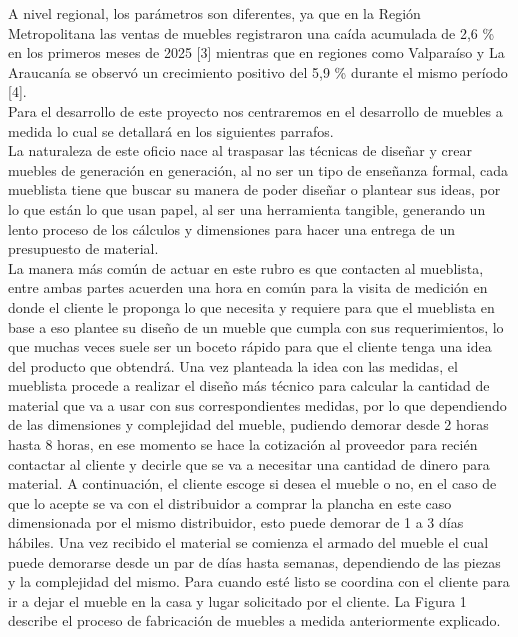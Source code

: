 \documentclass[12pt,oneside]{article}
\begin{document}
\noindent A nivel regional, los parámetros son diferentes, ya que en la Región Metropolitana las ventas de muebles registraron una caída acumulada de 2,6 \% en los primeros meses de 2025 [3] mientras que en regiones como Valparaíso y La Araucanía se observó un crecimiento positivo del 5,9 \% durante el mismo período [4].\\

\noindent Para el desarrollo de este proyecto nos centraremos en el desarrollo de muebles a medida lo cual se detallará en los siguientes parrafos.\\

\noindent La naturaleza de este oficio nace al traspasar las técnicas de diseñar y crear muebles de generación en generación, al no ser un tipo de enseñanza formal, cada mueblista tiene que buscar su manera de poder diseñar o plantear sus ideas, por lo  que están lo que usan papel, al ser una herramienta tangible, generando un lento proceso de los cálculos y dimensiones para hacer una entrega de un presupuesto de material.\\

\noindent La manera más común de actuar en este rubro es que contacten al mueblista, entre ambas partes acuerden una hora en común para la visita de medición en donde el cliente le proponga lo que necesita y requiere para que el mueblista en base a eso plantee su diseño de un mueble que cumpla con sus requerimientos, lo que muchas veces suele ser un boceto rápido para que el cliente tenga una idea del producto que obtendrá. Una vez planteada la idea con las medidas, el mueblista procede a realizar el diseño más técnico para calcular la cantidad de material que va a usar con sus correspondientes medidas, por lo que dependiendo de las dimensiones y complejidad del mueble, pudiendo demorar desde 2 horas hasta 8 horas, en ese momento se hace la cotización al proveedor para recién contactar al cliente y decirle que se va a necesitar una cantidad de dinero para material. A continuación, el cliente escoge si desea el mueble o no, en el caso de que lo acepte se va con el distribuidor a comprar la plancha en este caso dimensionada por el mismo distribuidor, esto puede demorar de 1 a 3 días hábiles. Una vez recibido el material se comienza el armado del mueble el cual puede demorarse desde un par de días hasta semanas, dependiendo de las piezas y la complejidad del mismo. Para cuando esté listo se coordina con el cliente para ir a dejar el mueble en la casa y lugar solicitado por el cliente. La Figura 1 describe el proceso de fabricación de muebles a medida anteriormente explicado.\\
\end{document}
